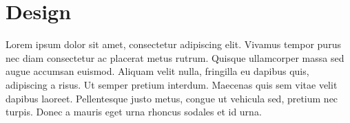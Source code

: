 \chapter{Design}

Lorem ipsum dolor sit amet, consectetur adipiscing elit. Vivamus tempor purus nec diam consectetur ac placerat metus rutrum. Quisque ullamcorper massa sed augue accumsan euismod. Aliquam velit nulla, fringilla eu dapibus quis, adipiscing a risus. Ut semper pretium interdum. Maecenas quis sem vitae velit dapibus laoreet. Pellentesque justo metus, congue ut vehicula sed, pretium nec turpis. Donec a mauris eget urna rhoncus sodales et id urna.








